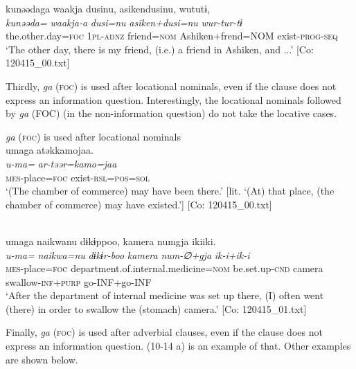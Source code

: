   \ex%
      \glll    kunəədaga  waakja  dusinu,  asikendusinu,                                     wututɨ,\\
      \textit{kunəəda=}  \textit{waakja-a}  \textit{dusi=nu}  \textit{asiken+dusi=nu}  \textit{wur-tur-tɨ}\\
      the.other.day=\textsc{foc}  1\textsc{pl}-\textsc{adnz}  friend=\textsc{nom}  Ashiken+frend=NOM                         exist-\textsc{prog}-\textsc{seq}\\
      \glt       ‘The other day, there is my friend, (i.e.) a friend in Ashiken, and ...’ [Co: 120415\_00.txt]
    \z
\z

  Thirdly, \textit{ga} (\textsc{foc}) is used after locational nominals, even if the clause does not express an information question. Interestingly, the locational nominals followed by \textit{ga} (FOC) (in the non-information question) do not take the locative cases.

\ea\label{ex:10.15}   \textit{ga} (\textsc{foc}) is used after locational nominals\\
  \ea  %
      \glll    umaga  atəkkamojaa.\\
      \textit{u-ma=}  \textit{ar-təər=kamo=jaa}\\
      \textsc{mes}-place=\textsc{foc}  exist-\textsc{rsl}=\textsc{pos}=\textsc{sol}\\
      \glt       ‘(The chamber of commerce) may have been there.’ [lit. ‘(At) that place, (the chamber of commerce) may have existed.’] [Co: 120415\_00.txt]

  \ex\relax  [= (4-38 a)]\\
      \glll    umaga  naikwanu  dɨkɨppoo,   {\textbar}kamera{\textbar}  numgja  ikiiki.\\
      \textit{u-ma=}  \textit{naikwa=nu}  \textit{dɨkɨr-boo}    \textit{kamera}  \textit{num-∅+gja}  \textit{ik-i+ik-i}\\
      \textsc{mes}-place=\textsc{foc}  department.of.internal.medicine=\textsc{nom}  be.set.up-\textsc{cnd}   camera  swallow-\textsc{inf}+\textsc{purp}  go-INF+go-INF\\
      \glt       ‘After the department of internal medicine was set up there, (I) often went (there) in order to swallow the (stomach) camera.’ [Co: 120415\_01.txt]
    \z
\z

  Finally, \textit{ga} (\textsc{foc}) is used after adverbial clauses, even if the clause does not express an information question. (10-14 a) is an example of that. Other examples are shown below.

